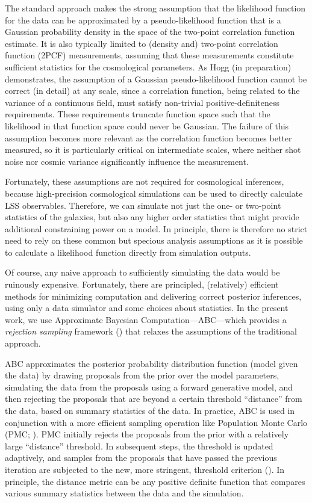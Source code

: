 \documentclass[fleqn,usenatbib]{mnras}
\begin{document}
The standard approach makes the strong assumption that the likelihood function 
for the data can be approximated by a pseudo-likelihood function that is a Gaussian
probability density in the space of the two-point correlation function estimate. 
It is also typically limited to (density and) two-point correlation 
function (2PCF) measurements, assuming that these measurements constitute 
sufficient statistics for the cosmological parameters. 
As Hogg (in preparation) demonstrates, the assumption of a Gaussian 
pseudo-likelihood function cannot be correct (in detail) at any scale, 
since a correlation function, being related to the 
variance of a continuous field, must satisfy non-trivial positive-definiteness 
requirements. These requirements truncate function space such that the 
likelihood in that function space could never be Gaussian. The failure of this 
assumption becomes more relevant as the correlation function becomes better measured, 
so it is particularly critical on intermediate scales, where neither shot 
noise nor cosmic variance significantly influence the measurement. 

Fortunately, these assumptions are not required for cosmological inferences, 
because high-precision cosmological simulations can be used to directly calculate 
LSS observables. Therefore, we can simulate not just the one- or two-point statistics of the galaxies, but also any higher order statistics that might provide additional constraining power on a model. In principle, there is therefore no strict need to rely on these common but specious analysis  assumptions as it is possible to calculate a likelihood function directly from simulation outputs.

Of course, any naive approach to sufficiently simulating the data would be ruinously
expensive. Fortunately, there are principled, (relatively) efficient methods for 
minimizing computation and delivering correct posterior inferences, using only a 
data simulator and some choices about statistics. 
In the present work, we use Approximate Bayesian Computation---ABC---which provides a \emph{rejection sampling} 
framework (\citealt{abcrejectionsampling}) that relaxes the assumptions of the traditional approach. 

ABC approximates the posterior probability distribution function (model given the data)
by drawing proposals from the prior over the model parameters, simulating the data from the 
proposals using a forward generative model, and then rejecting the proposals that are beyond 
a certain threshold ``distance'' from the data, based on summary statistics of the data. 
In practice, ABC is used in conjunction with a more efficient sampling operation like 
Population Monte Carlo (PMC; \citealt{smc}). 
PMC initially rejects the proposals from the prior with a relatively large ``distance'' threshold. 
In subsequent steps, the threshold is updated adaptively, and samples from the proposals that have 
passed the previous iteration are subjected to the new, more stringent, threshold criterion (\citealt{abcpmc}). 
In principle, the distance metric can be any positive definite function that compares 
various summary statistics between the data and the simulation.  
\end{document}
